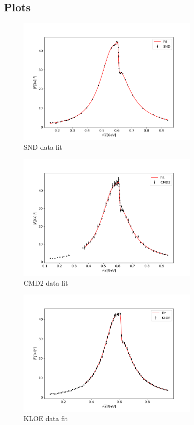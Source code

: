 \documentclass[a4paper]{article}
\begin{document}
\subsection{Plots\label{plots}}
\begin{figure}[H]
    \centering
    \includegraphics[width=0.8\textwidth]{./plots/SND.png}
    \caption{SND data fit\label{fig1}}
\end{figure}
\begin{figure}[H]
    \centering
    \includegraphics[width=0.8\textwidth]{./plots/CMD2.png}
    \caption{CMD2 data fit\label{fig2}}
\end{figure}
\begin{figure}[H]
    \centering
    \includegraphics[width=0.8\textwidth]{./plots/KLOE.png}
    \caption{KLOE data fit\label{fig3}}
\end{figure}
\end{document}
